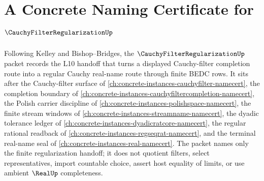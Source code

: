 \chapter{A Concrete Naming Certificate for $\CauchyFilterRegularizationUp$}
\label{ch:concrete-instances-cauchy-filter-regularization-namecert}

Following Kelley and Bishop--Bridges, the $\CauchyFilterRegularizationUp$ packet records the L10 handoff that turns a displayed Cauchy-filter completion route into a regular Cauchy real-name route through finite BEDC rows. It sits after the Cauchy-filter surface of \autoref{ch:concrete-instances-cauchyfilter-namecert}, the completion boundary of \autoref{ch:concrete-instances-cauchyfiltercompletion-namecert}, the Polish carrier discipline of \autoref{ch:concrete-instances-polishspace-namecert}, the finite stream windows of \autoref{ch:concrete-instances-streamname-namecert}, the dyadic tolerance ledger of \autoref{ch:concrete-instances-dyadicratcore-namecert}, the regular rational readback of \autoref{ch:concrete-instances-regseqrat-namecert}, and the terminal real-name seal of \autoref{ch:concrete-instances-real-namecert}. The packet names only the finite regularization handoff; it does not quotient filters, select representatives, import countable choice, assert host equality of limits, or use ambient $\RealUp$ completeness.

